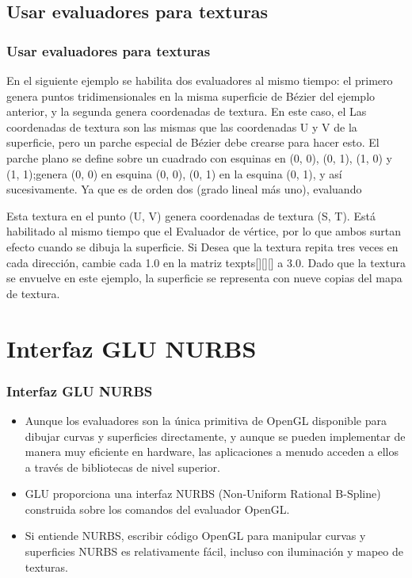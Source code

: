 \documentclass[10.5pt]{beamer}
\begin{document}
\subsection{Usar evaluadores para texturas}
\begin{frame}[fragile]
\frametitle{Usar evaluadores para texturas}
\small
En el siguiente ejemplo se  habilita dos evaluadores al mismo tiempo: el primero genera puntos tridimensionales en
la misma superficie de Bézier del ejemplo anterior, y la segunda genera coordenadas de textura. En este caso, el
Las coordenadas de textura son las mismas que las coordenadas U y V de la superficie, pero un parche especial de Bézier
debe crearse para hacer esto.
El parche plano se define sobre un cuadrado con esquinas en (0, 0), (0, 1), (1, 0) y (1, 1);genera (0, 0) en
esquina (0, 0), (0, 1) en la esquina (0, 1), y así sucesivamente. Ya que es de orden dos (grado lineal más uno), evaluando

Esta textura en el punto (U, V) genera coordenadas de textura (S, T). Está habilitado al mismo tiempo que el
Evaluador de vértice, por lo que ambos surtan efecto cuando se dibuja la superficie. Si
Desea que la textura repita tres veces en cada dirección, cambie cada 1.0 en la matriz texpts[][][] a 3.0.
Dado que la textura se envuelve en este ejemplo, la superficie se representa con nueve copias del mapa de textura.
\end{frame}


\section{Interfaz GLU NURBS}
\begin{frame}[fragile]
\frametitle{Interfaz GLU NURBS}
\small
\begin{itemize}
    \justifying
    \item Aunque los evaluadores son la única primitiva de OpenGL
    disponible para dibujar curvas y superficies directamente,
    y aunque se pueden implementar de manera muy eficiente en hardware,
    las aplicaciones a menudo acceden a ellos a través
    de bibliotecas de nivel superior.
    \item   GLU proporciona una interfaz NURBS (Non-Uniform Rational B-Spline)
    construida sobre los comandos del evaluador OpenGL.
    \item   Si entiende NURBS, escribir código OpenGL para
    manipular curvas y superficies NURBS es relativamente
    fácil, incluso con iluminación y mapeo de texturas.
\end{itemize}
\end{frame}
\end{document}

